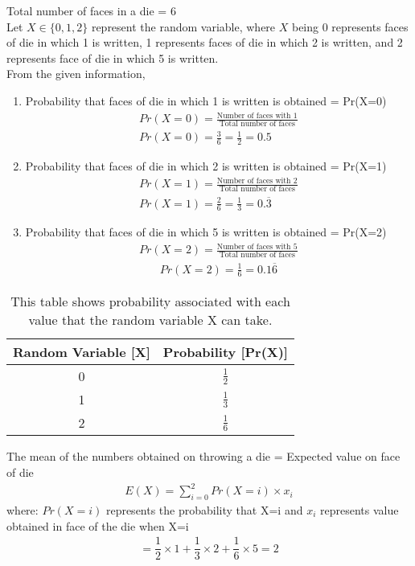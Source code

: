 Total number of faces in a die = 6
\\Let $X \in \{0,1,2\}$ represent the random variable, where $X$ being 0 represents faces of die in which 1 is written, 1 represents faces of die in which 2 is written, and 2 represents face of die in which 5 is written. \\From the given information, 
\begin{enumerate}
    
\item Probability that faces of die in which 1 is written is obtained = Pr(X=0)
\begin{align}
    Pr(X=0) = \frac{\text{Number of faces with 1}}{\text{Total number of faces}}\\
    Pr(X=0) = \frac{3}{6} = \frac{1}{2} = 0.5
\end{align}
\item Probability that faces of die in which 2 is written is obtained = Pr(X=1)
\begin{align}
    Pr(X=1) = \frac{\text{Number of faces with 2}}{\text{Total number of faces}}\\
    Pr(X=1) = \frac{2}{6} = \frac{1}{3} = 0.\overline{3}
\end{align}
\item Probability that faces of die in which 5 is written is obtained = Pr(X=2)
\begin{align}
    Pr(X=2) = \frac{\text{Number of faces with 5}}{\text{Total number of faces}}
\end{align}
\begin{align}
    Pr(X=2) = \frac{1}{6} = 0.1\overline{6}
\end{align}
\end{enumerate}
\begin{table}[!ht]
\centering
\begin{tabular}{|c|c|}
\hline
Random Variable {[}X{]} & Probability {[}Pr(X){]} \\ \hline
0                      & $\frac{1}{2}$                    \\ \hline
1                      & $\frac{1}{3}$                    \\ \hline
2                      & $\frac{1}{6}$                   \\ \hline
\end{tabular}
\caption{This table shows probability associated with each value that the random variable X can take.}
\label{tab:Table_next 5.10}
\end{table}
The mean of the numbers obtained on throwing
a die = Expected value on face of die
\begin{align}
E(X) = \sum_{i = 0}^{2} Pr(X=i) \times x_{i}
\end{align}
where: $Pr(X=i)$ represents the probability that X=i and $x_{i}$ represents value obtained in face of the die when X=i 
\begin{align}
= \dfrac{1}{2} \times 1 + \dfrac{1}{3} \times 2 + \dfrac{1}{6} \times 5 = 2
\end{align}
